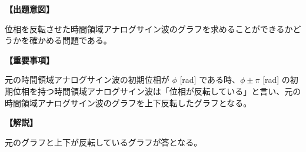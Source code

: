 \noindent \textbf{【出題意図】}

\noindent 位相を反転させた時間領域アナログサイン波のグラフを求めることができるかどうかを確かめる問題である。

\vspace{1em}
\noindent \textbf{【重要事項】}

\bigskip
元の時間領域アナログサイン波の初期位相が $\phi$ [rad] である時、$\phi \pm \pi$ [rad] の初期位相を持つ時間領域アナログサイン波は「位相が反転している」と言い、元の時間領域アナログサイン波のグラフを上下反転したグラフとなる。

\vspace{1em}
\noindent \textbf{【解説】}

\noindent 元のグラフと上下が反転しているグラフが答となる。
